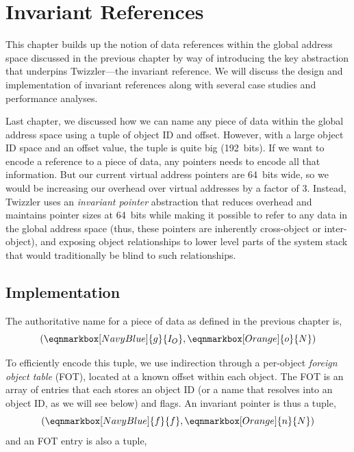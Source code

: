 
\chapter{Invariant References}\label{ch:invariant}

\begin{chabstract}
    This chapter builds up the notion of data references within the global address space discussed in the previous chapter by way of introducing the key abstraction that underpins
    Twizzler---the invariant reference. We will discuss the design and implementation of invariant references along with several case studies and performance analyses.
\end{chabstract}


Last chapter, we discussed how we can name any piece of data within the global address space using a tuple of object ID
and offset. However, with a large object ID space and an offset value, the tuple is quite big (192~bits). If we want to
encode a reference to a piece of data, any pointers needs to encode all that information. But our current virtual
address pointers are 64~bits wide, so we would be increasing our overhead over virtual addresses by a factor of 3.
Instead, Twizzler uses an \emph{invariant pointer} abstraction that reduces overhead and maintains pointer sizes at
64~bits while making it possible to refer to any data in the global address space (thus, these pointers are inherently
cross-object or inter-object), and exposing object relationships to lower level parts of the system stack that would
traditionally be blind to such relationships.

\section{Implementation}


The authoritative name for a piece of data as defined in the previous chapter is,
\begin{equation*}
    \left(
    \eqnmarkbox[NavyBlue]{g}{I_O}
    , \eqnmarkbox[Orange]{o}{N}\right)
\end{equation*}

To efficiently encode this tuple, we use indirection through a per-object \textit{foreign
    object table} (FOT), located at a known offset within each object. The FOT is an array of entries
that each stores an object ID (or a name that resolves into an object ID, as we will see
below) and flags. An invariant pointer is thus a tuple,
\begin{equation*}
    \left(
    \eqnmarkbox[NavyBlue]{f}{f}
    , \eqnmarkbox[Orange]{n}{N}\right)
\end{equation*}
and an FOT entry is also a tuple,

